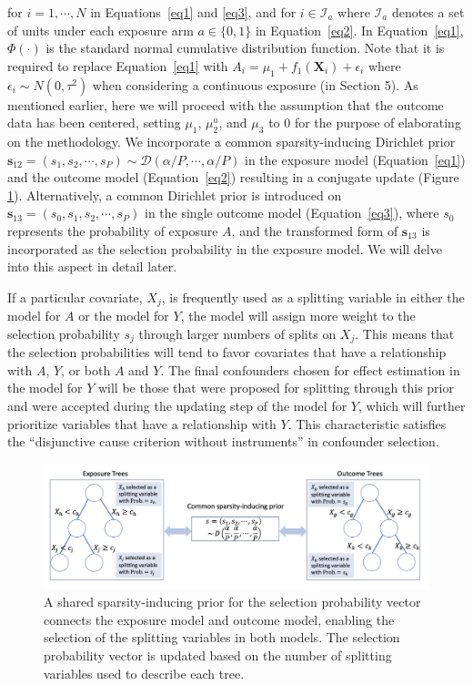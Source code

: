 for $i=1, \cdots, N$ in Equations~\ref{eq1} and \ref{eq3}, and for $i \in \mathcal{I}_a$ where $\mathcal{I}_a$ denotes a set of units under each exposure arm $a \in \{0, 1\}$ in Equation~\ref{eq2}. In Equation~\ref{eq1}, $\Phi(\cdot)$ is the standard normal cumulative distribution function. Note that it is required to replace Equation~\ref{eq1} with $A_i = \mu_1+f_1(\boldsymbol{X}_i) + \epsilon_i$ where $\epsilon_i \sim N(0, \tau^2)$ when considering a continuous exposure (in Section 5). As mentioned earlier, here we will proceed with the assumption that the outcome data has been centered, setting $\mu_1$, $\mu_2^a$, and $\mu_3$ to 0 for the purpose of elaborating on the methodology. We incorporate a common sparsity-inducing Dirichlet prior $ \boldsymbol{s}_{12}=(s_1, s_2, \cdots, s_P) \sim \mathcal{D}(\alpha/P, \cdots, \alpha/P)$ in the exposure model (Equation~\ref{eq1}) and the outcome model (Equation~\ref{eq2}) resulting in a conjugate update (Figure \ref{fig:connection}). Alternatively, a common Dirichlet prior is introduced on $\boldsymbol{s}_{13} = (s_0, s_1, s_2, \cdots , s_P)$ in the single outcome model (Equation~\ref{eq3}), where $s_0$ represents the probability of exposure $A$, and the transformed form of $\boldsymbol{s}_{13}$ is incorporated as the selection probability in the exposure model. We will delve into this aspect in detail later.

If a particular covariate, $X_j$, is frequently used as a splitting variable in either the model for $A$ or the model for $Y$, the model will assign more weight to the selection probability $s_j$ through larger numbers of splits on $X_j$. This means that the selection probabilities will tend to favor covariates that have a relationship with $A$, $Y$, or both $A$ and $Y$. The final confounders chosen for effect estimation in the model for $Y$ will be those that were proposed for splitting through this prior and were accepted during the updating step of the model for $Y$, which will further prioritize variables that have a relationship with $Y$. This characteristic satisfies the ``disjunctive cause criterion without instruments'' in confounder selection.
\begin{figure}[htbp]
\centering
\includegraphics[width=0.99\linewidth]{fig/fig2.png}
\caption{A shared sparsity-inducing prior for the selection probability vector connects the exposure model and outcome model, enabling the selection of the splitting variables in both models. The selection probability vector is updated based on the number of splitting variables used to describe each tree.
}\label{fig:connection}
\end{figure}
